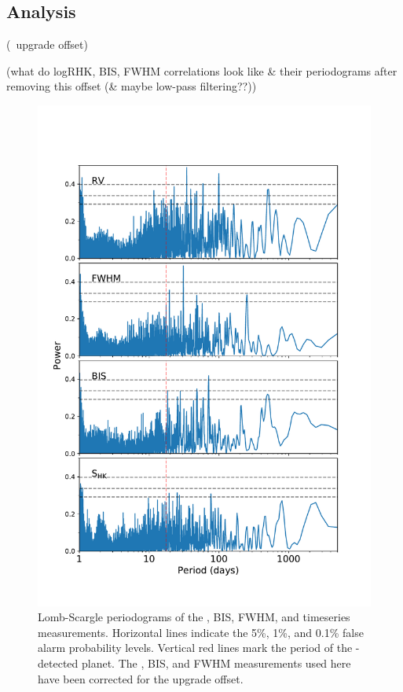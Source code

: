 \documentclass[modern]{aastex62}
\begin{document}
\subsection{\RV Analysis}
\label{s:analysis:rvs}

(\HARPS\ upgrade offset)

(what do logRHK, BIS, FWHM correlations look like \& their periodograms after removing this offset (\& maybe low-pass filtering??))

\begin{figure}
    \centering
    \includegraphics[width=\textwidth]{periodograms.pdf}
    \caption{Lomb-Scargle periodograms of the \HARPS \RV, BIS, FWHM, and \shk timeseries measurements. Horizontal lines indicate the 5\%, 1\%, and 0.1\% false alarm probability levels. Vertical red lines mark the period of the \TESS-detected planet. The \RV, BIS, and FWHM measurements used here have been corrected for the \HARPS upgrade offset.}
    \label{fig:periodograms}
\end{figure}
\end{document}
